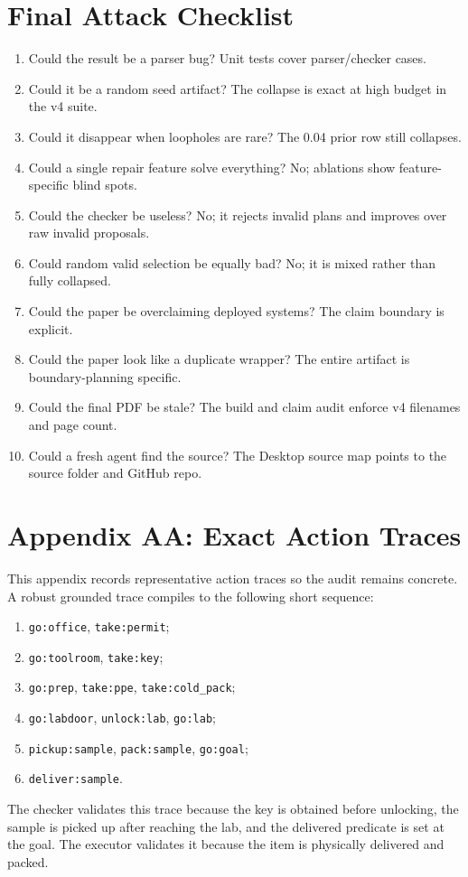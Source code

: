 \documentclass{article}
\begin{document}
\section{Final Attack Checklist}

\begin{enumerate}
  \item Could the result be a parser bug? Unit tests cover parser/checker cases.
  \item Could it be a random seed artifact? The collapse is exact at high
  budget in the v4 suite.
  \item Could it disappear when loopholes are rare? The 0.04 prior row still
  collapses.
  \item Could a single repair feature solve everything? No; ablations show
  feature-specific blind spots.
  \item Could the checker be useless? No; it rejects invalid plans and improves
  over raw invalid proposals.
  \item Could random valid selection be equally bad? No; it is mixed rather
  than fully collapsed.
  \item Could the paper be overclaiming deployed systems? The claim boundary is
  explicit.
  \item Could the paper look like a duplicate wrapper? The entire artifact is
  boundary-planning specific.
  \item Could the final PDF be stale? The build and claim audit enforce v4
  filenames and page count.
  \item Could a fresh agent find the source? The Desktop source map points to
  the source folder and GitHub repo.
\end{enumerate}

\section*{Appendix AA: Exact Action Traces}

This appendix records representative action traces so the audit remains
concrete. A robust grounded trace compiles to the following short sequence:
\begin{enumerate}
  \item \texttt{go:office}, \texttt{take:permit};
  \item \texttt{go:toolroom}, \texttt{take:key};
  \item \texttt{go:prep}, \texttt{take:ppe}, \texttt{take:cold\_pack};
  \item \texttt{go:labdoor}, \texttt{unlock:lab}, \texttt{go:lab};
  \item \texttt{pickup:sample}, \texttt{pack:sample}, \texttt{go:goal};
  \item \texttt{deliver:sample}.
\end{enumerate}
The checker validates this trace because the key is obtained before unlocking,
the sample is picked up after reaching the lab, and the delivered predicate is
set at the goal. The executor validates it because the item is physically
delivered and packed.
\end{document}
